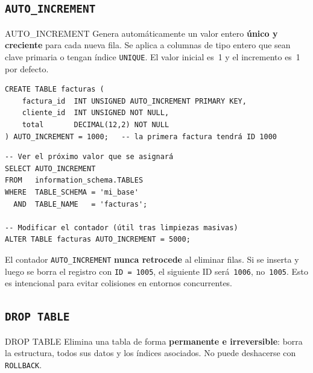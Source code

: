\subsection{\texttt{AUTO\_INCREMENT}}

\begin{definicion}{AUTO\_INCREMENT}
  Genera automáticamente un valor entero \textbf{único y creciente} para
  cada nueva fila. Se aplica a columnas de tipo entero que sean clave
  primaria o tengan índice \texttt{UNIQUE}. El valor inicial es~1 y el
  incremento es~1 por defecto.
\end{definicion}

\begin{lstlisting}[style=sql, caption={AUTO\_INCREMENT con valor inicial personalizado}]
CREATE TABLE facturas (
    factura_id  INT UNSIGNED AUTO_INCREMENT PRIMARY KEY,
    cliente_id  INT UNSIGNED NOT NULL,
    total       DECIMAL(12,2) NOT NULL
) AUTO_INCREMENT = 1000;   -- la primera factura tendrá ID 1000
\end{lstlisting}

\begin{lstlisting}[style=sql, caption={Consultar y modificar el contador AUTO\_INCREMENT}]
-- Ver el próximo valor que se asignará
SELECT AUTO_INCREMENT
FROM   information_schema.TABLES
WHERE  TABLE_SCHEMA = 'mi_base'
  AND  TABLE_NAME   = 'facturas';

-- Modificar el contador (útil tras limpiezas masivas)
ALTER TABLE facturas AUTO_INCREMENT = 5000;
\end{lstlisting}

\begin{nota}
  El contador \texttt{AUTO\_INCREMENT} \textbf{nunca retrocede} al eliminar
  filas. Si se inserta y luego se borra el registro con \texttt{ID = 1005},
  el siguiente ID será~\texttt{1006}, no~\texttt{1005}. Esto es intencional
  para evitar colisiones en entornos concurrentes.
\end{nota}

\subsection{\texttt{DROP TABLE}}

\begin{definicion}{DROP TABLE}
  Elimina una tabla de forma \textbf{permanente e irreversible}: borra la
  estructura, todos sus datos y los índices asociados. No puede deshacerse
  con \texttt{ROLLBACK}.
\end{definicion}


